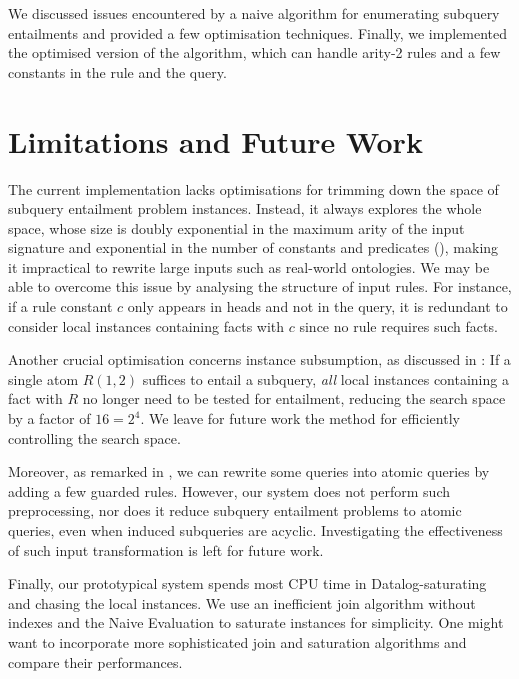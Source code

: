\documentclass[12pt]{report}
\theoremstyle{plain}
\theoremstyle{definition}
\begin{document}
We discussed issues encountered by a naive algorithm for enumerating subquery entailments and provided a few optimisation techniques. Finally, we implemented the optimised version of the algorithm, which can handle arity-2 rules and a few constants in the rule and the query.

\section{Limitations and Future Work}
\label{section:limitations-and-future-work}


The current implementation lacks optimisations for trimming down the space of subquery entailment problem instances. Instead, it always explores the whole space, whose size is doubly exponential in the maximum arity of the input signature and exponential in the number of constants and predicates (), making it impractical to rewrite large inputs such as real-world ontologies. We may be able to overcome this issue by analysing the structure of input rules. For instance, if a rule constant $c$ only appears in heads and not in the query, it is redundant to consider local instances containing facts with $c$ since no rule requires such facts.

Another crucial optimisation concerns instance subsumption, as discussed in : If a single atom $R(1, 2)$ suffices to entail a subquery, \emph{all} local instances containing a fact with $R$ no longer need to be tested for entailment, reducing the search space by a factor of $16 = 2^4$. We leave for future work the method for efficiently controlling the search space.

Moreover, as remarked in , we can rewrite some queries into atomic queries by adding a few guarded rules. However, our system does not perform such preprocessing, nor does it reduce subquery entailment problems to atomic queries, even when induced subqueries are acyclic. Investigating the effectiveness of such input transformation is left for future work.

Finally, our prototypical system spends most CPU time in Datalog-saturating and chasing the local instances. We use an inefficient join algorithm without indexes and the Naive Evaluation to saturate instances for simplicity. One might want to incorporate more sophisticated join and saturation algorithms and compare their performances.

\printbibliography
\end{document}
